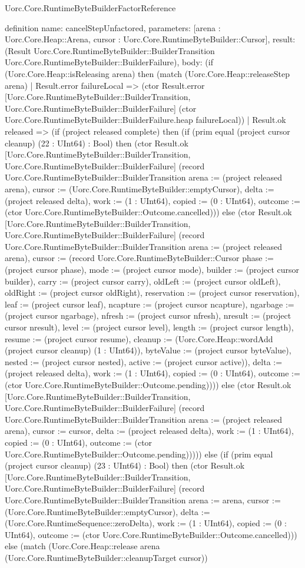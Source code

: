 \begin{lexlean}{Uorc.Core.RuntimeByteBuilderFactorReference}
\begin{semanticmodule}
definition{
  name: cancelStepUnfactored,
  parameters: [arena : Uorc.Core.Heap::Arena, cursor : Uorc.Core.RuntimeByteBuilder::Cursor],
  result: (Result Uorc.Core.RuntimeByteBuilder::BuilderTransition Uorc.Core.RuntimeByteBuilder::BuilderFailure),
  body: (if (Uorc.Core.Heap::isReleasing arena) then (match (Uorc.Core.Heap::releaseStep arena)
    | Result.error failureLocal => (ctor Result.error [Uorc.Core.RuntimeByteBuilder::BuilderTransition, Uorc.Core.RuntimeByteBuilder::BuilderFailure] (ctor Uorc.Core.RuntimeByteBuilder::BuilderFailure.heap failureLocal))
    | Result.ok released => (if (project released complete) then (if (prim equal (project cursor cleanup) (22 : UInt64) : Bool) then (ctor Result.ok [Uorc.Core.RuntimeByteBuilder::BuilderTransition, Uorc.Core.RuntimeByteBuilder::BuilderFailure] (record Uorc.Core.RuntimeByteBuilder::BuilderTransition {arena := (project released arena), cursor := (Uorc.Core.RuntimeByteBuilder::emptyCursor), delta := (project released delta), work := (1 : UInt64), copied := (0 : UInt64), outcome := (ctor Uorc.Core.RuntimeByteBuilder::Outcome.cancelled)})) else (ctor Result.ok [Uorc.Core.RuntimeByteBuilder::BuilderTransition, Uorc.Core.RuntimeByteBuilder::BuilderFailure] (record Uorc.Core.RuntimeByteBuilder::BuilderTransition {arena := (project released arena), cursor := (record Uorc.Core.RuntimeByteBuilder::Cursor {phase := (project cursor phase), mode := (project cursor mode), builder := (project cursor builder), carry := (project cursor carry), oldLeft := (project cursor oldLeft), oldRight := (project cursor oldRight), reservation := (project cursor reservation), leaf := (project cursor leaf), ncapture := (project cursor ncapture), ngarbage := (project cursor ngarbage), nfresh := (project cursor nfresh), nresult := (project cursor nresult), level := (project cursor level), length := (project cursor length), resume := (project cursor resume), cleanup := (Uorc.Core.Heap::wordAdd (project cursor cleanup) (1 : UInt64)), byteValue := (project cursor byteValue), nested := (project cursor nested), active := (project cursor active)}), delta := (project released delta), work := (1 : UInt64), copied := (0 : UInt64), outcome := (ctor Uorc.Core.RuntimeByteBuilder::Outcome.pending)}))) else (ctor Result.ok [Uorc.Core.RuntimeByteBuilder::BuilderTransition, Uorc.Core.RuntimeByteBuilder::BuilderFailure] (record Uorc.Core.RuntimeByteBuilder::BuilderTransition {arena := (project released arena), cursor := cursor, delta := (project released delta), work := (1 : UInt64), copied := (0 : UInt64), outcome := (ctor Uorc.Core.RuntimeByteBuilder::Outcome.pending)})))) else (if (prim equal (project cursor cleanup) (23 : UInt64) : Bool) then (ctor Result.ok [Uorc.Core.RuntimeByteBuilder::BuilderTransition, Uorc.Core.RuntimeByteBuilder::BuilderFailure] (record Uorc.Core.RuntimeByteBuilder::BuilderTransition {arena := arena, cursor := (Uorc.Core.RuntimeByteBuilder::emptyCursor), delta := (Uorc.Core.RuntimeSequence::zeroDelta), work := (1 : UInt64), copied := (0 : UInt64), outcome := (ctor Uorc.Core.RuntimeByteBuilder::Outcome.cancelled)})) else (match (Uorc.Core.Heap::release arena (Uorc.Core.RuntimeByteBuilder::cleanupTarget cursor))
}
\end{semanticmodule}
\end{lexlean}
